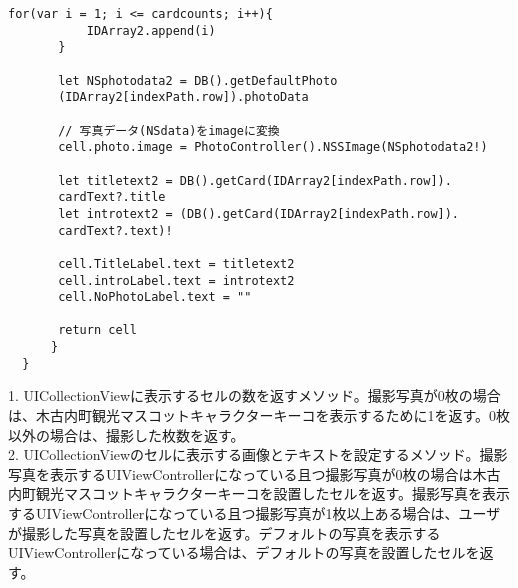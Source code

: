 \begin{description}
\begin{lstlisting}[basicstyle=\ttfamily\footnotesize, frame=single]
       for(var i = 1; i <= cardcounts; i++){
           IDArray2.append(i)
       }
            
       let NSphotodata2 = DB().getDefaultPhoto
       (IDArray2[indexPath.row]).photoData
       
       // 写真データ(NSdata)をimageに変換
       cell.photo.image = PhotoController().NSSImage(NSphotodata2!)
            
       let titletext2 = DB().getCard(IDArray2[indexPath.row]).
       cardText?.title
       let introtext2 = (DB().getCard(IDArray2[indexPath.row]).
       cardText?.text)!
            
       cell.TitleLabel.text = titletext2
       cell.introLabel.text = introtext2
       cell.NoPhotoLabel.text = ""
            
       return cell
      }
  }
 \end{lstlisting}

1. UICollectionViewに表示するセルの数を返すメソッド。撮影写真が0枚の場合は、木古内町観光マスコットキャラクターキーコを表示するために1を返す。0枚以外の場合は、撮影した枚数を返す。 \\
2. UICollectionViewのセルに表示する画像とテキストを設定するメソッド。撮影写真を表示するUIViewControllerになっている且つ撮影写真が0枚の場合は木古内町観光マスコットキャラクターキーコを設置したセルを返す。撮影写真を表示するUIViewControllerになっている且つ撮影写真が1枚以上ある場合は、ユーザが撮影した写真を設置したセルを返す。デフォルトの写真を表示するUIViewControllerになっている場合は、デフォルトの写真を設置したセルを返す。
\end{description}

